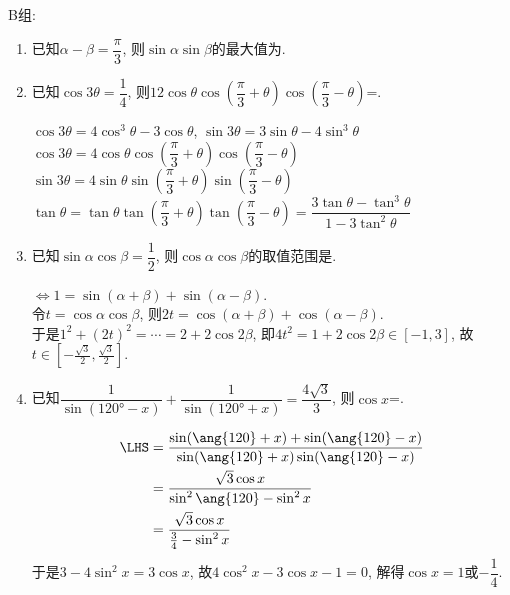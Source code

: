 B组:
\begin{enumerate}
\item 已知$\alpha-\beta=\dfrac{\pi}{3}$, 则$\sin\alpha\sin\beta$的最大值为. 

\item 已知$\cos3\theta=\dfrac{1}{4}$, 则$12\cos\theta\cos\left(\dfrac{\pi}{3}+\theta\right)\cos\left(\dfrac{\pi}{3}-\theta\right)$=. 
\begin{jieda}
$\cos3\theta=4\cos^3\theta-3\cos\theta$, $\sin3\theta=3\sin\theta-4\sin^3\theta$\\
$\cos3\theta=4\cos\theta\cos\left(\dfrac{\pi}{3}+\theta\right)\cos\left(\dfrac{\pi}{3}-\theta\right)$\\
$\sin3\theta=4\sin\theta\sin\left(\dfrac{\pi}{3}+\theta\right)\sin\left(\dfrac{\pi}{3}-\theta\right)$\\
$\tan\theta=\tan\theta\tan\left(\dfrac{\pi}{3}+\theta\right)\tan\left(\dfrac{\pi}{3}-\theta\right)=\dfrac{3\tan\theta-\tan^3\theta}{1-3\tan^2\theta}$
\end{jieda}


\item 已知$\sin\alpha\cos\beta=\dfrac{1}{2}$, 则$\cos\alpha\cos\beta$的取值范围是. 
\begin{jieda}
$\iff 1=\sin(\alpha+\beta)+\sin(\alpha-\beta)$. \\
令$t=\cos\alpha\cos\beta$, 则$2t=\cos(\alpha+\beta)+\cos(\alpha-\beta)$. \\
于是$1^2+(2t)^2=\cdots=2+2\cos2\beta$, 即$4t^2=1+2\cos2\beta\in[-1,3]$, 故$t\in[-\frac{\sqrt{3}}{2},\frac{\sqrt{3}}{2}]$. 
\end{jieda}

\item 已知$\dfrac{1}{\sin(\ang{120}-x)}+\dfrac{1}{\sin(\ang{120}+x)}=\dfrac{4\sqrt{3}}{3}$, 则$\cos{x}$=. 
\begin{jieda}
\begin{align*}
\LHS & = \dfrac{\sin(\ang{120}+x)+\sin(\ang{120}-x)}{\sin(\ang{120}+x)\sin(\ang{120}-x)}\\
& = \dfrac{\sqrt{3}\cos{x}}{\sin^2\ang{120}-\sin^2x}\\
& = \dfrac{\sqrt{3}\cos{x}}{\frac{3}{4}-\sin^2x}
\end{align*}
于是$3-4\sin^2x=3\cos{x}$, 故$4\cos^2x-3\cos{x}-1=0$, 解得$\cos{x}=1$或$-\dfrac{1}{4}$. 
\end{jieda}


\end{enumerate}
